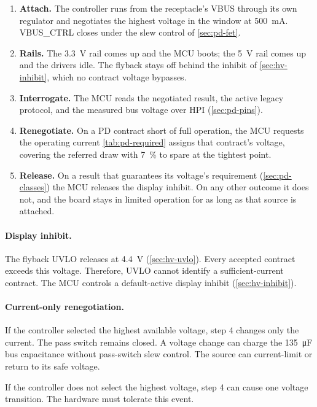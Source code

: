 \begin{enumerate}[itemsep=2pt]
  \item \textbf{Attach.} The controller runs from the receptacle's VBUS through
    its own regulator and negotiates the highest voltage in the window at
    \SI{500}{\milli\ampere}. VBUS\_CTRL closes under the slew control of
    \cref{sec:pd-fet}.
  \item \textbf{Rails.} The 3.3~V rail comes up and the MCU boots; the 5~V rail
    comes up and the drivers idle. The flyback stays off behind the inhibit of
    \cref{sec:hv-inhibit}, which no contract voltage bypasses.
  \item \textbf{Interrogate.} The MCU reads the negotiated result, the active
    legacy protocol, and the measured bus voltage over HPI
    (\cref{sec:pd-pins}).
  \item \textbf{Renegotiate.} On a PD contract short of full operation, the MCU
    requests the operating current \cref{tab:pd-required} assigns that
    contract's voltage, covering the referred draw with \SI{7}{\percent} to
    spare at the tightest point.
  \item \textbf{Release.} On a result that guarantees its voltage's requirement
    (\cref{sec:pd-classes}) the MCU releases the display inhibit. On any other
    outcome it does not, and the board stays in limited operation for as long
    as that source is attached.
\end{enumerate}

\paragraph{Display inhibit.} The flyback UVLO releases at
\SI{4.4}{\volt} (\cref{sec:hv-uvlo}). Every accepted contract exceeds this
voltage. Therefore, UVLO cannot identify a sufficient-current contract. The
MCU controls a default-active display inhibit (\cref{sec:hv-inhibit}).

\paragraph{Current-only renegotiation.} If the controller selected the highest
available voltage, step 4 changes only the current. The pass switch remains
closed. A voltage change can charge the \SI{135}{\micro\farad} bus capacitance
without pass-switch slew control. The source can current-limit or return to its
safe voltage.

If the controller does not select the highest voltage, step 4 can cause one
voltage transition. The hardware must tolerate this event.


